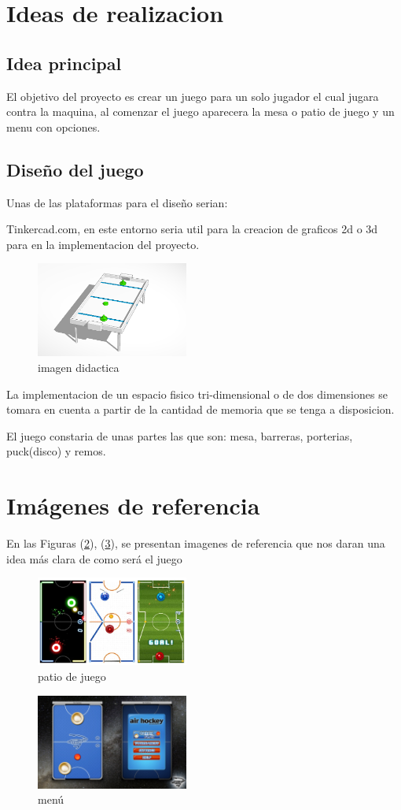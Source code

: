 \documentclass{article}
\begin{document}
\section{Ideas de realizacion}
\label{contenido}
\subsection{Idea principal}

El objetivo del proyecto es crear un juego para un solo jugador el cual jugara contra la maquina, al comenzar el juego aparecera la mesa o patio de juego y un menu con opciones.

\subsection{Diseño del juego}
Unas de las plataformas para el diseño serian: 

Tinkercad.com, en este entorno seria util para la creacion de graficos 2d o 3d para en la implementacion del proyecto.

\begin{figure}[h]
\includegraphics[width=5cm]{ideacion/plantilla_latex/imagenes/tinkercad_1.png}
\centering
\caption{imagen didactica}
\label{fig:cpplogo}
\end{figure}
La implementacion de un espacio fisico tri-dimensional o de dos dimensiones se tomara en cuenta a partir de la cantidad de memoria que se tenga a disposicion.


El juego constaria de unas partes las que son: mesa, barreras, porterias, puck(disco) y remos.

\section{ Imágenes de referencia} \label{imagenes}

En las Figuras (\ref{fig:Air-Hockey}), (\ref{fig:air-menu}), se   presentan imagenes de referencia que nos daran una idea más clara de como será el juego

\label{imagenes}
\begin{figure}[h]
\includegraphics[width=5cm]{imagenes/Air-Hockey.png}
\centering
\caption{patio de juego}
\label{fig:Air-Hockey}
\end{figure}


\label{imagenes}
\begin{figure}[h]
\includegraphics[width=5cm]{ideacion/plantilla_latex/imagenes/air-menu.jpg}
\centering
\caption{ menú}
\label{fig:air-menu}
\end{figure}
\end{document}
